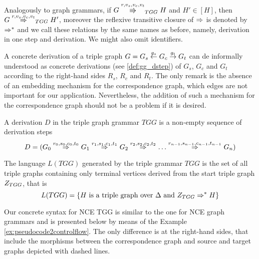 \begin{definition}
	Analogously to graph grammars, if $G \cderiv{r}{v_s,v_c,v_t}{TGG} H$ and $H' \in [H]$, then $G \tderiv{r}{v_s,v_c,v_t}{TGG} H'$, moreover the reflexive transitive closure of $\tderiv{}{}{}$ is denoted by $\Rightarrow^*_{}$ and we call these relations by the same names as before, namely, derivation in one step and derivation. We might also omit identifiers.
\end{definition}

A concrete derivation of a triple graph $G = G_s \overset{g_s}{\leftarrow} G_c \overset{g_t}{\rightarrow} G_t$ can de informally understood as concrete derivations (see \ref{def:gg_dstep}) of $G_s$, $G_c$ and $G_t$ according to the right-hand sides $R_s$, $R_c$ and $R_t$. The only remark is the absence of an embedding mechanism for the correspondence graph, which edges are not important for our application. Nevertheless, the addition of such a mechanism for the correspondence graph should not be a problem if it is desired.

\begin{definition}
	A derivation $D$ in the triple graph grammar $TGG$ is a non-empty sequence of derivation steps
	\[ 
	D = (G_0 \tderiv{r_0}{s_0,c_0,t_0}{} G_1 \tderiv{r_1}{s_1,c_1,t_1}{} G_2 \tderiv{r_2}{s_2,c_2,t_2}{} \dots \tderiv{r_{n-1}}{s_{n-1},c_{n-1},t_{n-1}}{} G_n)
	\]
\end{definition}

\begin{definition}
	\label{def:tlanguage}
	The language $L(TGG)$ generated by the triple grammar $TGG$ is the set of all triple graphs containing only terminal vertices derived from the start triple graph $Z_{TGG}$, that is
	\[
	L(TGG) = \{H \text{ is a triple graph over } \Delta \text{ and } Z_{TGG} \Rightarrow^*_{} H\}
	\]
\end{definition}

Our concrete syntax for NCE TGG is similar to the one for NCE graph grammars and is presented below by means of the Example \ref{ex:pseudocode2controlflow}. The only difference is at the right-hand sides, that include the morphisms between the correspondence graph and source and target graphs depicted with dashed lines.

